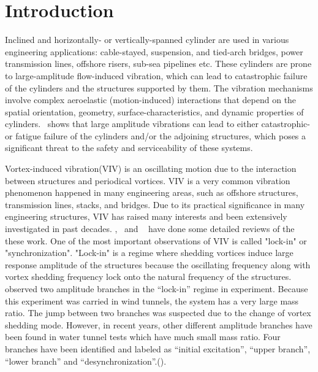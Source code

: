 \documentclass[12pt,authoryear]{elsarticle}
\begin{document}

\section{Introduction}
\label{sec:intro}
%
Inclined and horizontally- or vertically-spanned cylinder are used in various
engineering applications: cable-stayed, suspension, and tied-arch bridges,
power transmission lines, offshore risers, sub-sea pipelines etc. These
cylinders are prone to large-amplitude flow-induced vibration, which can
lead to catastrophic failure of the cylinders and the structures supported by
them. The vibration mechanisms involve complex aeroelastic (motion-induced)
interactions that depend on the spatial orientation, geometry,
surface-characteristics, and dynamic properties of cylinders.~\cite{davenport1995dynamics} 
shows that large amplitude vibrations can lead to
either catastrophic- or fatigue failure of the cylinders and/or the adjoining
structures, which poses a significant threat to the safety and serviceability of
these systems.

Vortex-induced vibration(VIV) is an oscillating motion due to the interaction
between structures and periodical vortices. VIV is a very common vibration
phenomenon happened in many engineering areas, such as offshore structures,
transmission lines, stacks, and bridges. Due to its practical significance in
many engineering structures, VIV has raised many interests and been extensively
investigated in past decades.
\cite{bearman1984vortex},~\cite{sarpkaya2004critical} and
~\cite{williamson2004vortex} have done some detailed reviews of the these work.
One of the most important observations of VIV is called "lock-in" or
"synchronization". "Lock-in" is a regime where shedding vortices induce large
response amplitude of the structures because the oscillating frequency along
with vortex shedding frequency lock onto the natural frequency of the
structures. ~\cite{feng1968measurement} observed two amplitude branches in the
``lock-in'' regime in experiment. Because this experiment was carried in wind
tunnels, the system has a very large mass ratio. The jump between two branches
was suspected due to the change of vortex shedding mode.    However, in recent
years, other different amplitude branches have been found in water tunnel tests
which have much small mass ratio. Four branches have been identified and
labeled as ``initial excitation'', ``upper branch'', ``lower branch'' and
``desynchronization''.(\cite{khalak1997fluid}). 
\end{document}
